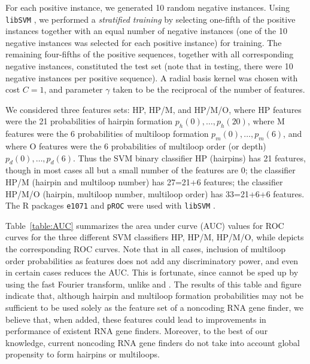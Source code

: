 For each positive instance, we generated 10 random negative instances.
Using {\tt libSVM} \citep{libSVM}, we performed a {\em stratified training}
by selecting one-fifth of the
positive instances together with an equal number of negative instances
(one of the 10 negative instances was selected for each positive instance)
for training. The remaining four-fifths of the positive sequences, together
with all corresponding negative instances, constituted the test set
(note that in testing, there were 10 negative instances per positive sequence).
A radial basis kernel was chosen with cost $C=1$, and parameter $\gamma$
taken to be the reciprocal of the number of features.

We considered three features sets: HP, HP/M, and HP/M/O,
where HP features were the 21 probabilities of hairpin formation
$p_h(0),\ldots,p_h(20)$, where M features were the 6 probabilities of
multiloop formation $p_m(0),\ldots,p_m(6)$, and where O features
were the 6 probabilities of multiloop order (or depth) $p_d(0),\ldots,p_d(6)$.
Thus the SVM binary classifier HP (hairpins) has 21 features, though in
most cases all but a small number of the features are $0$;
the classifier HP/M (hairpin and multiloop number) has
27=21+6 features; the classifier HP/M/O (hairpin, multiloop number,
multiloop order) has 33=21+6+6 features.
The R packages {\tt e1071} \citep{RpackageForSVM} and {\tt pROC} \citep{pROC}
were used with {\tt libSVM} \citep{libSVM}.

Table~\ref{table:AUC} summarizes the area under curve (AUC) values for
ROC curves for the three different SVM classifiers HP, HP/M, HP/M/O,
while  depicts the corresponding
ROC curves. Note that in all cases, inclusion of multiloop order probabilities
as features does not add any discriminatory power, and even in certain cases
reduces the AUC. This is fortunate, since {\rnamlorder} cannot be
sped up by using the fast Fourier transform, unlike {\rnahairpin} and
{\rnamlnumber}. The results of this table and figure indicate that,
although hairpin and multiloop formation probabilities may not be
sufficient to be used solely as the feature set of a noncoding RNA gene
finder, we believe that, when added, these features could lead to improvements
in performance of existent RNA gene finders. Moreover, to the best of our
knowledge, current noncoding RNA gene finders do not take into account
global propensity to form hairpins or multiloops.

